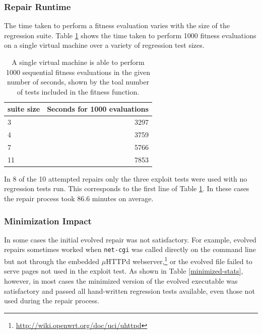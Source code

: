 \documentclass{sigcomm-alternate}
\begin{document}
\subsubsection{Repair Runtime}
\label{runtime}
The time taken to perform a fitness evaluation varies with the size of
the regression suite.  Table \ref{test-speed} shows the time taken to
perform 1000 fitness evaluations on a single virtual machine over a
variety of regression test sizes.

\begin{table}[htb]
\centering
\begin{tabular}{l|r}
suite size & Seconds for 1000 evaluations \\
\hline
3          & 3297                         \\
4          & 3759                         \\
7          & 5766                         \\
11         & 7853                         \\
\end{tabular}
\caption{\label{test-speed}A single virtual machine is able to perform
  1000 sequential fitness evaluations in the given number of seconds,
  shown by the toal number of tests included in the fitness
  function.}
\end{table}

In 8 of the 10 attempted repairs only the three exploit tests were
used with no regression tests run.  This corresponds to the first line
of Table \ref{test-speed}.  In these cases the repair process took
86.6 minutes on average.

\subsubsection{Minimization Impact}
\label{minimization}

In some cases the initial evolved repair was not satisfactory.  For
example, evolved repairs sometimes worked when \texttt{net-cgi} was
called directly on the command line but not through the embedded
$\mu$HTTPd webserver,\footnote{\url{http://wiki.openwrt.org/doc/uci/uhttpd}}
or the evolved file failed to serve pages not used in the
exploit test.  As shown in Table \ref{minimized-stats}, however, in most
cases the minimized version of the evolved executable was satisfactory
and passed all hand-written regression tests available, even those not used
during the repair process. 
\end{document}
